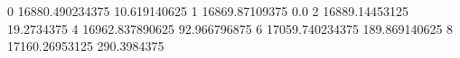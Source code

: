 0 16880.490234375 10.619140625
1 16869.87109375 0.0
2 16889.14453125 19.2734375
4 16962.837890625 92.966796875
6 17059.740234375 189.869140625
8 17160.26953125 290.3984375
